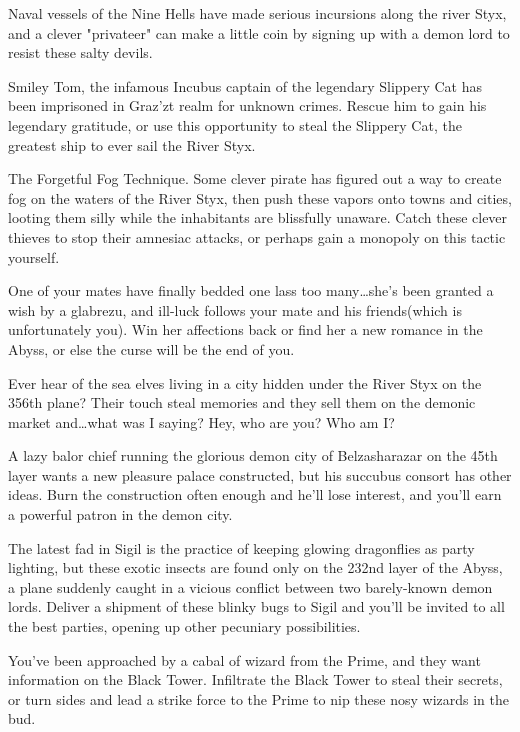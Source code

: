 \listone
	\item Naval vessels of the Nine Hells have made serious incursions along the river Styx, and a clever "privateer" can make a little coin by signing up with a demon lord to resist these salty devils.
	\item Smiley Tom, the infamous Incubus captain of the legendary Slippery Cat has been imprisoned in Graz'zt realm for unknown crimes. Rescue him to gain his legendary gratitude, or use this opportunity to steal the Slippery Cat, the greatest ship to ever sail the River Styx.
	\item The Forgetful Fog Technique. Some clever pirate has figured out a way to create fog on the waters of the River Styx, then push these vapors onto towns and cities, looting them silly while the inhabitants are blissfully unaware. Catch these clever thieves to stop their amnesiac attacks, or perhaps gain a monopoly on this tactic yourself.
	\item One of your mates have finally bedded one lass too many\ldots she's been granted a wish by a glabrezu, and ill-luck follows your mate and his friends(which is unfortunately you). Win her affections back or find her a new romance in the Abyss, or else the curse will be the end of you.
	\item Ever hear of the sea elves living in a city hidden under the River Styx on the 356th plane? Their touch steal memories and they sell them on the demonic market and\ldots what was I saying? Hey, who are you? Who am I?
	\item A lazy balor chief running the glorious demon city of Belzasharazar on the 45th layer wants a new pleasure palace constructed, but his succubus consort has other ideas. Burn the construction often enough and he'll lose interest, and you'll earn a powerful patron in the demon city.
	\item The latest fad in Sigil is the practice of keeping glowing dragonflies as party lighting, but these exotic insects are found only on the 232nd layer of the Abyss, a plane suddenly caught in a vicious conflict between two barely-known demon lords. Deliver a shipment of these blinky bugs to Sigil and you'll be invited to all the best parties, opening up other pecuniary possibilities.
	\item You've been approached by a cabal of wizard from the Prime, and they want information on the Black Tower. Infiltrate the Black Tower to steal their secrets, or turn sides and lead a strike force to the Prime to nip these nosy wizards in the bud.

